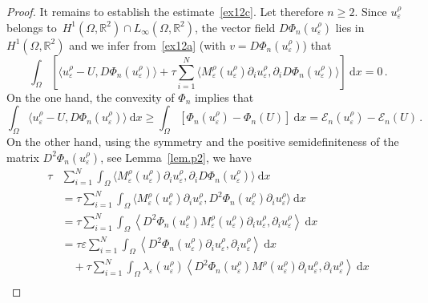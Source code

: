 \documentclass[10pt]{amsart}
\theoremstyle{definition}\newtheorem{defi}[theo]{Definition}\newtheorem{rema}[theo]{Remark}\newtheorem{exam}[theo]{Example}\newtheorem{exem}[theo]{Example}\newtheorem{nota}[theo]{Notation}
\newcommand{\bbR}{\mathbb{R}}
\newcommand{\clE}{\mathcal{E}}
\newcommand{\rmd}{\mathrm{d}}
\begin{document}
\begin{proof}
It remains to establish the estimate~\eqref{ex12c}. Let therefore $n\ge 2$. Since $u_{\varepsilon}^\rho$ belongs to~$H^1(\Omega,\bbR^2)\cap L_\infty(\Omega,\bbR^2)$, the vector field $D\Phi_n(u_\varepsilon^\rho)$ lies in $H^1(\Omega,\bbR^2)$ and we infer from~\eqref{ex12a} (with $v=D\Phi_n(u_\varepsilon^\rho)$) that
\begin{equation}\label{pro1}
\int_\Omega \left[\big\langle u_{\varepsilon}^\rho -U, D\Phi_n(u_\varepsilon^\rho) \big\rangle + \tau \sum_{i=1}^N\big\langle M_{\varepsilon }^\rho(u_{\varepsilon}^\rho) \partial_i u_{\varepsilon}^\rho, \partial_i D\Phi_n(u_\varepsilon^\rho)\big\rangle \right]\ \rmd x = 0\,.
\end{equation}
On the one hand, the convexity of $\Phi_n$ implies that
\begin{equation}\label{pro2}
\int_\Omega \big\langle u_{\varepsilon}^\rho -U, D\Phi_n(u_\varepsilon^\rho) \big\rangle\ \rmd x \ge \int_\Omega \left[\Phi_n(u_{\varepsilon}^\rho) - \Phi_n(U)\right]\ \rmd x =\clE_n(u_\varepsilon^\rho) - \clE_n(U)\,.
\end{equation}
On the other hand, using the symmetry and the positive semidefiniteness of the matrix $ D^2\Phi_n(u_\varepsilon^\rho)$, see Lemma~\ref{lem.p2}, we have
\begingroup
\allowdisplaybreaks
\begin{equation}\label{pro3}
\begin{split}
\tau &\sum_{i=1}^N\int_\Omega \big\langle M_{\varepsilon}^\rho(u_{\varepsilon}^\rho) \partial_i u_{\varepsilon}^\rho, \partial_i D\Phi_n(u_\varepsilon^\rho)\big\rangle\ \rmd x \\[1ex]
&=\tau \sum_{i=1}^N\int_\Omega \big\langle M_{\varepsilon }^\rho(u_{\varepsilon}^\rho) \partial_i u_{\varepsilon}^\rho, D^2\Phi_n(u_\varepsilon^\rho)\partial _i u_\varepsilon^\rho\big\rangle\ \rmd x \\[1ex]
&=\tau \sum_{i=1}^N\int_\Omega \left\langle D^2\Phi_n(u_\varepsilon^\rho) M_{\varepsilon }^\rho(u_{\varepsilon}^\rho) \partial_i u_{\varepsilon}^\rho, \partial _i u_\varepsilon^\rho\right\rangle\ \rmd x
\\
&=\tau\varepsilon \sum_{i=1}^N\int_\Omega \left\langle D^2\Phi_n(u_\varepsilon^\rho) \partial_i u_{\varepsilon}^\rho, \partial _i u_\varepsilon^\rho\right\rangle\ \rmd x\\[1ex]
&\quad + \tau \sum_{i=1}^N\int_\Omega \lambda_\varepsilon(u_\varepsilon^\rho) \left\langle D^2\Phi_n(u_\varepsilon^\rho) M^\rho(u_\varepsilon^\rho) \partial_i u_{\varepsilon}^\rho, \partial _i u_\varepsilon^\rho\right\rangle\ \rmd x\\[1ex]

\end{split}
\end{equation}
\end{proof}
\end{document}
